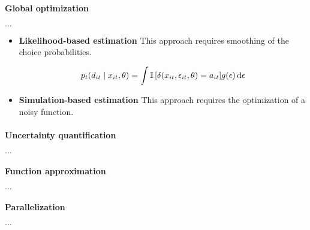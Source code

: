 \paragraph{Global optimization} $\hdots$


\begin{itemize}
  \item \textbf{Likelihood-based estimation} This approach requires smoothing of the choice probabilities.

  \begin{align*}
    p_t(d_{it} \mid x_{it}, \theta) = \int \mathbb{I}\, [ \delta(x_{it}, \epsilon_{it}, \theta) = a_{it} ] g(\epsilon) \mathop{}\!\mathrm{d} \epsilon
  \end{align*}

  \item \textbf{Simulation-based estimation} This approach requires the optimization of a noisy function.


\end{itemize}

\paragraph{Uncertainty quantification} $\hdots$

\paragraph{Function approximation} $\hdots$

\paragraph{Parallelization} $\hdots$
